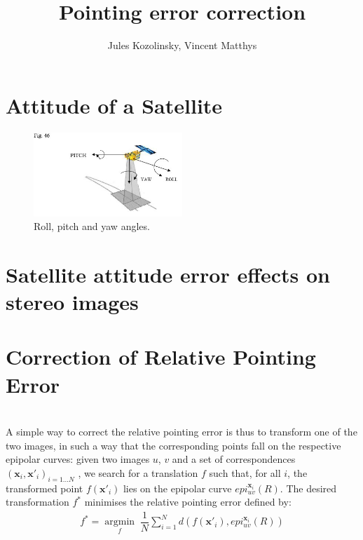 \documentclass[paper=a4, fontsize=11pt]{article}
\title{\normalfont \normalsize 
\huge Pointing error correction}
\author{Jules Kozolinsky, Vincent Matthys}
\date{}
\newcommand{\argmin}[1]{\underset{#1}{\operatorname{argmin}}\;}
\begin{document}
\maketitle

\section{Attitude of a Satellite}

\begin{figure}[h]
	\centering
	\includegraphics[width=0.5\textwidth]{figures/angles.jpg}
   \caption{ Roll, pitch and yaw angles.}
   \label{angles}
\end{figure}

\section{Satellite attitude error effects on stereo images}
\label{sec:sensibility}

\section{Correction of Relative Pointing Error}
\cite{de2014automatic}\\

A simple way to correct the relative pointing error is thus to transform one of the two images, in such a way that the corresponding points fall on the respective epipolar curves: given two images $u$, $v$ and a set of correspondences $(\textbf{x}_i , \textbf{x}'_i)_{i=1...N}$ , we search for a translation $f$ such that, for all $i$, the transformed point $f(\textbf{x}'_i)$ lies on the epipolar curve $epi^{\textbf{x}_i}_{u v}(R)$.
The desired transformation $f^{*}$ minimises the relative pointing error defined by:
\begin{align}
\label{minif}
f^* = \argmin{f} \dfrac{1}{N} \sum\limits_{i=1}^{N} d(f(\textbf{x}'_i), epi^{\textbf{x}_i}_{u v}(R))
\end{align}
\end{document}
